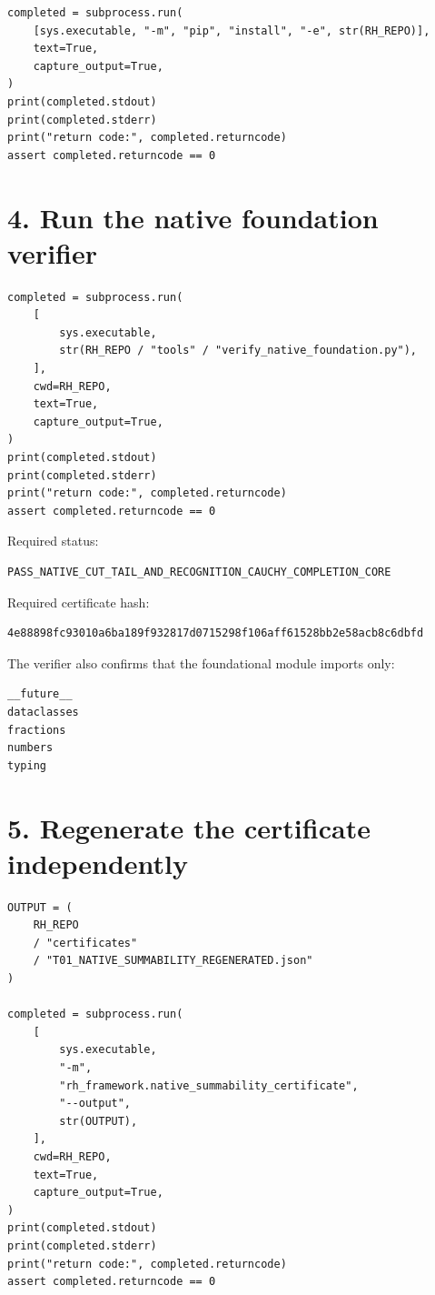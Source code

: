 \begin{verbatim}
completed = subprocess.run(
    [sys.executable, "-m", "pip", "install", "-e", str(RH_REPO)],
    text=True,
    capture_output=True,
)
print(completed.stdout)
print(completed.stderr)
print("return code:", completed.returncode)
assert completed.returncode == 0
\end{verbatim}

\hypertarget{run-the-native-foundation-verifier}{%
\section{4. Run the native foundation verifier}\label{run-the-native-foundation-verifier}}

\begin{verbatim}
completed = subprocess.run(
    [
        sys.executable,
        str(RH_REPO / "tools" / "verify_native_foundation.py"),
    ],
    cwd=RH_REPO,
    text=True,
    capture_output=True,
)
print(completed.stdout)
print(completed.stderr)
print("return code:", completed.returncode)
assert completed.returncode == 0
\end{verbatim}

Required status:

\begin{verbatim}
PASS_NATIVE_CUT_TAIL_AND_RECOGNITION_CAUCHY_COMPLETION_CORE
\end{verbatim}

Required certificate hash:

\begin{verbatim}
4e88898fc93010a6ba189f932817d0715298f106aff61528bb2e58acb8c6dbfd
\end{verbatim}

The verifier also confirms that the foundational module imports only:

\begin{verbatim}
__future__
dataclasses
fractions
numbers
typing
\end{verbatim}

\hypertarget{regenerate-the-certificate-independently}{%
\section{5. Regenerate the certificate independently}\label{regenerate-the-certificate-independently}}

\begin{verbatim}
OUTPUT = (
    RH_REPO
    / "certificates"
    / "T01_NATIVE_SUMMABILITY_REGENERATED.json"
)

completed = subprocess.run(
    [
        sys.executable,
        "-m",
        "rh_framework.native_summability_certificate",
        "--output",
        str(OUTPUT),
    ],
    cwd=RH_REPO,
    text=True,
    capture_output=True,
)
print(completed.stdout)
print(completed.stderr)
print("return code:", completed.returncode)
assert completed.returncode == 0
\end{verbatim}

